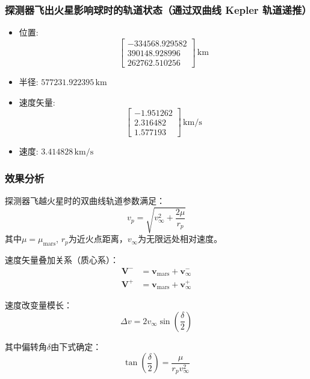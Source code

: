\documentclass[12pt,a4paper]{article}
\begin{document}
\subsubsection{探测器飞出火星影响球时的轨道状态（通过双曲线 Kepler 轨道递推）}
\begin{itemize}
    \item 位置: 
    \[
    \begin{bmatrix}
        -334568.929582 \\ 390148.928996 \\ 262762.510256
    \end{bmatrix} \, \text{km}
    \]
    \item 半径: \(577231.922395 \, \text{km}\)
    \item 速度矢量: 
    \[
    \begin{bmatrix}
        -1.951262 \\ 2.316482 \\ 1.577193
    \end{bmatrix} \, \text{km/s}
    \]
    \item 速度: \(3.414828 \, \text{km/s}\)
\end{itemize}

\subsubsection{效果分析}

探测器飞越火星时的双曲线轨道参数满足：
\begin{equation}
    v_p = \sqrt{v_{\infty}^2 + \frac{2\mu}{r_p}}
\end{equation}
其中$\mu = \mu_{\text{mars}}$, $r_p$为近火点距离，$v_{\infty}$为无限远处相对速度。

速度矢量叠加关系（质心系）：
\begin{align}
    \mathbf{V}^- &= \mathbf{v}_{\text{mars}} + \mathbf{v}_{\infty}^- \\
    \mathbf{V}^+ &= \mathbf{v}_{\text{mars}} + \mathbf{v}_{\infty}^+
\end{align}

速度改变量模长：
\begin{equation}
    \Delta v = 2v_{\infty} \sin\left(\frac{\delta}{2}\right)
\end{equation}

其中偏转角$\delta$由下式确定：
\begin{equation}
    \tan\left(\frac{\delta}{2}\right) = \frac{\mu}{r_p v_{\infty}^2}
\end{equation}
\end{document}
